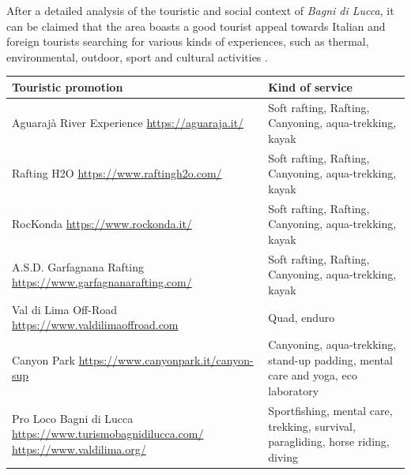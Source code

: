 \documentclass[sustainability,article,submit,pdftex,moreauthors]{Definitions/mdpi}
\begin{document}
After a detailed analysis of the touristic and social context of \emph{Bagni di Lucca}, it can be claimed that the area boasts a good tourist appeal towards Italian and foreign tourists searching for various kinds of experiences, such as thermal, environmental, outdoor, sport and cultural activities  \cite{loz09}.


\begin{table}
    \centering
    \begin{tabular}{|p{70mm}||p{45mm}|} \hline 
         {\bf Touristic promotion }&  {\bf Kind of service}\\
         \hline \hline 
         Aguarajà River Experience \newline \url{https://aguaraja.it/}& Soft rafting, Rafting, Canyoning, aqua-trekking, kayak\\
         \hline 
         Rafting H2O \newline \url{https://www.raftingh2o.com/}& Soft rafting, Rafting, Canyoning, aqua-trekking, kayak\\
         \hline 
         RocKonda \newline \url{https://www.rockonda.it/}& Soft rafting, Rafting, Canyoning, aqua-trekking, kayak\\ \hline 
         A.S.D. Garfagnana Rafting \newline \url{https://www.garfagnanarafting.com/}& Soft rafting, Rafting, Canyoning, aqua-trekking, kayak\\ 
        \hline 
         Val di Lima Off-Road \newline \url{https://www.valdilimaoffroad.com} & Quad, enduro\\ \hline 
         Canyon Park \newline \url{https://www.canyonpark.it/canyon-sup}& Canyoning, aqua-trekking, stand-up padding, mental care and yoga, eco laboratory\\
         \hline 
         Pro Loco Bagni di Lucca \newline  \url{https://www.turismobagnidilucca.com/} \newline \url{https://www.valdilima.org/}& Sportfishing, mental care, trekking, survival, paragliding, horse riding, diving\\

\end{tabular}
\end{table}
\end{document}
